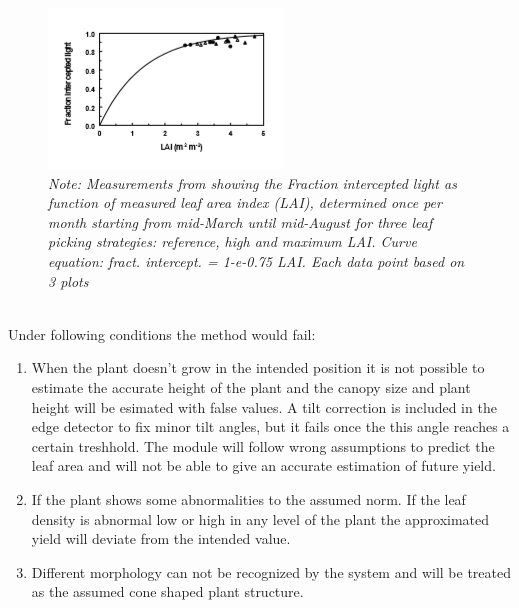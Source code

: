 \begin{figure}[h]
    \centering
    \includegraphics[scale=1.2]{LAI.PNG}
    \caption{\textit{Note: Measurements from \cite{heuvelink2004effect} showing the Fraction intercepted light as function of measured leaf area index (LAI), determined once per month starting from mid-March until mid-August for three leaf picking strategies: reference, high and maximum LAI.  Curve equation: fract. intercept. = 1-e-0.75 LAI.  Each data point based on 3 plots}}
    \label{fig:LaiCurve}
\end{figure}\\

Under following conditions the method would fail:

\begin{enumerate}
    \item When the plant doesn't grow in the intended position it is not possible to estimate the accurate height of the plant and the canopy size and plant height will be esimated with false values. A tilt correction is included in the edge detector to fix minor tilt angles, but it fails once the this angle reaches a certain treshhold. The module will follow wrong assumptions to predict the leaf area and will not be able to give an accurate estimation of future yield.

    \item If the plant shows some abnormalities to the assumed norm. If the leaf density is abnormal low or high in any level of the plant the approximated yield will deviate from the intended value.

    \item Different morphology can not be recognized by the system and will be treated as the assumed cone shaped plant structure.
\end{enumerate}
